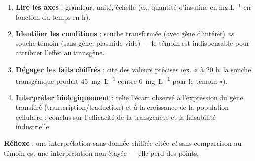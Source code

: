 \documentclass[11pt]{article}
\newcommand{\cle}[1]{{\popxbold\color{popdark}#1}}
\begin{document}
\begin{methode}
\begin{enumerate}
\item \textbf{Lire les axes} : grandeur, unité, échelle (ex. quantité d'insuline en mg.L$^{-1}$ en fonction du temps en h).
\item \textbf{Identifier les conditions} : souche transformée (avec gène d'intérêt) \emph{vs} souche \cle{témoin} (sans gène, plasmide vide) — le témoin est indispensable pour attribuer l'effet au transgène.
\item \textbf{Dégager les faits chiffrés} : cite des valeurs précises (ex. « à 20 h, la souche transgénique produit \SI{45}{mg.L^{-1}} contre \SI{0}{mg.L^{-1}} pour le témoin »).
\item \textbf{Interpréter biologiquement} : relie l'écart observé à l'expression du gène transféré (transcription/traduction) et à la croissance de la population cellulaire ; conclus sur l'efficacité de la transgenèse et la faisabilité industrielle.
\end{enumerate}
\textbf{Réflexe} : une interprétation sans donnée chiffrée citée \emph{et} sans comparaison au témoin est une interprétation non étayée — elle perd des points.
\end{methode}
\end{document}
